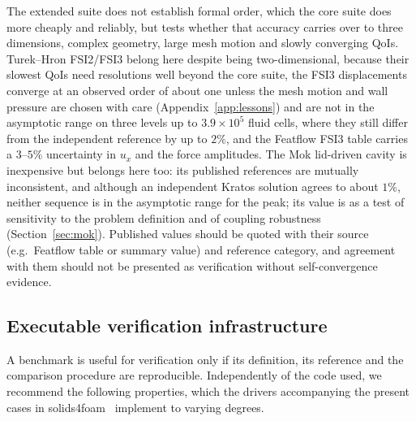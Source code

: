 The extended suite does not establish formal order, which the core suite does more cheaply and reliably, but tests whether that accuracy carries over to three dimensions, complex geometry, large mesh motion and slowly converging QoIs.
Turek--Hron FSI2/FSI3 belong here despite being two-dimensional, because their slowest QoIs need resolutions well beyond the core suite, the FSI3 displacements converge at an observed order of about one unless the mesh motion and wall pressure are chosen with care (Appendix~\ref{app:lessons}) and are not in the asymptotic range on three levels up to $3.9\times10^5$ fluid cells, where they still differ from the independent reference by up to $2\%$, and the Featflow FSI3 table carries a $3$--$5\%$ uncertainty in $u_x$ and the force amplitudes.
The Mok lid-driven cavity is inexpensive but belongs here too: its published references are mutually inconsistent, and although an independent Kratos solution agrees to about $1\%$, neither sequence is in the asymptotic range for the peak; its value is as a test of sensitivity to the problem definition and of coupling robustness (Section~\ref{sec:mok}).
Published values should be quoted with their source (e.g.\ Featflow table or summary value) and reference category, and agreement with them should not be presented as verification without self-convergence evidence.


\subsection{Executable verification infrastructure}\label{sec:infrastructure}

A benchmark is useful for verification only if its definition, its reference and the comparison procedure are reproducible.
Independently of the code used, we recommend the following properties, which the drivers accompanying the present cases in solids4foam~\citep{Cardiff2025} implement to varying degrees.

